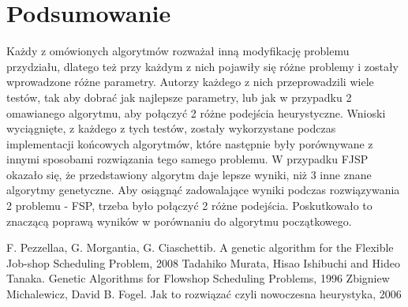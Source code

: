 \documentclass{article}
\begin{document}
 \section{Podsumowanie}
 Każdy z omówionych algorytmów rozważał inną modyfikację problemu przydziału, dlatego też przy każdym z nich pojawiły się różne problemy i zostały wprowadzone różne parametry. Autorzy każdego z nich przeprowadzili wiele testów, tak aby dobrać jak najlepsze parametry, lub jak w przypadku 2 omawianego algorytmu, aby połączyć 2 różne podejścia heurystyczne. Wnioski wyciągnięte, z każdego z tych testów, zostały wykorzystane podczas implementacji końcowych algorytmów, które następnie były porównywane z innymi sposobami rozwiązania tego samego problemu. W przypadku FJSP okazało się, że przedstawiony algorytm daje lepsze wyniki, niż 3 inne znane algorytmy genetyczne. Aby osiągnąć zadowalające wyniki podczas rozwiązywania 2 problemu - FSP, trzeba było połączyć 2 różne podejścia. Poskutkowało to znaczącą poprawą wyników w porównaniu do algorytmu początkowego.

\begin{thebibliography}{9}
F. Pezzellaa, G. Morgantia, G. Ciaschettib.
A genetic algorithm for the Flexible Job-shop Scheduling Problem, 2008
Tadahiko Murata, Hisao Ishibuchi and Hideo Tanaka.
Genetic Algorithms for Flowshop Scheduling Problems, 1996
Zbigniew Michalewicz, David B. Fogel.
Jak to rozwiązać czyli nowoczesna heurystyka, 2006
\end{thebibliography}
\end{document}
